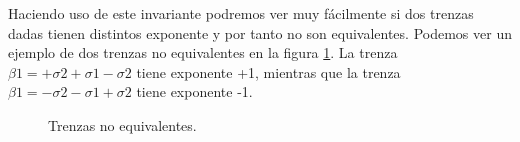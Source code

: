 \documentclass[14pt]{extarticle}
\begin{document}
Haciendo uso de este invariante podremos ver muy fácilmente si dos trenzas dadas tienen distintos exponente y por tanto no son equivalentes. Podemos ver un ejemplo de dos trenzas no equivalentes en la figura \ref{exp2}. La trenza $\beta1 = +\sigma2+\sigma1-\sigma2$ tiene exponente +1, mientras que la trenza $\beta1 = -\sigma2-\sigma1+\sigma2$ tiene exponente -1.\\ 
	\begin{figure}[h!]
		\centering
		\caption{Trenzas no equivalentes.}
		\label{exp2} 
	\end{figure}
	
\end{document}

